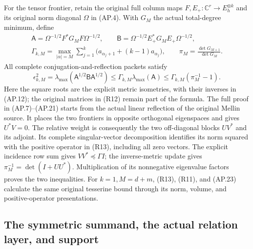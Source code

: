 For the tensor frontier, retain the original full column maps
\(F,E_+:\mathbb C^r\to E_h^{\otimes k}\) and its original
norm diagonal \(\Omega\) in (AP.4).  With \(G_M\) the
actual total-degree minimum, define
\[
 \begin{gathered}
 \mathsf A=\Omega^{-1/2}F^*G_MF\Omega^{-1/2},\qquad
 \mathsf B=\Omega^{-1/2}E_+^*G_ME_+\Omega^{-1/2},\\
 \Gamma_{k,M}=\max_{|\alpha|=M}
       \sum_{j=1}^k\bigl(a_{\alpha_j+1}+(k-1)a_{\alpha_j}\bigr),
 \qquad \pi_M=\frac{\det G_{M+1}}{\det G_M}.
 \end{gathered}
 \tag{R12}
\]
All complete conjugation-and-reflection packets satisfy
\[
 \boxed{\epsilon_{k,M}^2
   =\lambda_{\max}(\mathsf A^{1/2}\mathsf B\mathsf A^{1/2})
   \le\Gamma_{k,M}\lambda_{\max}(\mathsf A)
   \le\Gamma_{k,M}(\pi_M^{-1}-1).}
 \tag{R13}
\]
Here the square roots are the explicit metric isometries, with
their inverses in (AP.12); the original matrices in (R12) remain
part of the formula.  The full proof in (AP.7)--(AP.21) starts
from the actual linear reflection of the original Mellin source.
It places the two frontiers in opposite orthogonal eigenspaces
and gives \(U^*V=0\).  The relative weight is consequently
the two off-diagonal blocks \(UV^*\) and its adjoint.  Its
complete singular-vector decomposition identifies its norm squared
with the positive operator in (R13), including all zero vectors.
The explicit incidence row sum gives \(VV^*\preceq\Gamma I\);
the inverse-metric update gives
\(\pi_M^{-1}=\det(I+UU^*)\).  Multiplication of its
nonnegative eigenvalue factors proves the two inequalities.
For \(k=1,M=d+m\), (R13), (R11), and (AP.23) calculate
the same original tesserine bound through its norm, volume, and
positive-operator presentations.

\subsection{The symmetric summand, the actual relation layer, and support}

